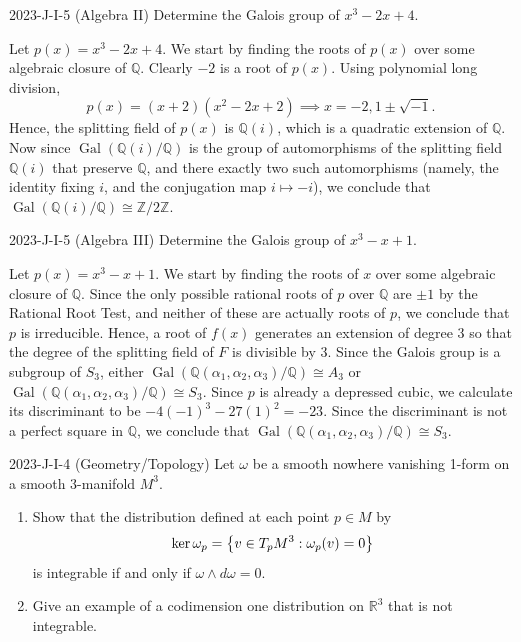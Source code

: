\documentclass{article}
\begin{document}
\begin{prb}{2023-J-I-5 (Algebra II)}
	Determine the Galois group of $x^{3} - 2x + 4$. 
\end{prb}
\begin{solutions}
	Let $p(x) = x^{3} - 2x + 4$. We start by finding the roots of $p(x)$ over some algebraic closure of $\mathbb{Q}$. Clearly $-2$ is a root of $p(x)$. Using polynomial long division, 
		\begin{equation}
			p(x) = (x+ 2)(x^{2} - 2x + 2) \implies x = -2, 1 \pm \sqrt{-1}. 
		\end{equation}
	Hence, the splitting field of $p(x)$ is $\mathbb{Q}(i)$, which is a quadratic extension of $\mathbb{Q}$. Now since $\operatorname{Gal}(\mathbb{Q}(i)/\mathbb{Q})$ is the group of automorphisms of the splitting field $\mathbb{Q}(i)$ that preserve $\mathbb{Q}$, and there exactly two such automorphisms (namely, the identity fixing $i$, and the conjugation map $i \mapsto -i$), we conclude that $\operatorname{Gal}(\mathbb{Q}(i)/\mathbb{Q}) \cong \mathbb{Z}/2\mathbb{Z}$. 
\end{solutions}
\begin{prb}{2023-J-I-5 (Algebra III)}
	Determine the Galois group of $x^{3} - x + 1$. 
\end{prb}
\begin{solutions}
	Let $p(x) = x^{3} - x + 1$. We start by finding the roots of $x$ over some algebraic closure of $\mathbb{Q}$. Since the only possible rational roots of $p$ over $\mathbb{Q}$ are $\pm 1$ by the Rational Root Test, and neither of these are actually roots of $p$, we conclude that $p$ is irreducible. Hence, a root of $f(x)$ generates an extension of degree 3 so that the degree of the splitting field of $F$ is divisible by 3. Since the Galois group is a subgroup of $S_{3}$, either $\operatorname{Gal}(\mathbb{Q}(\alpha_{1}, \alpha_{2}, \alpha_{3})/\mathbb{Q}) \cong A_{3}$ or $\operatorname{Gal}(\mathbb{Q}(\alpha_{1}, \alpha_{2}, \alpha_{3})/\mathbb{Q}) \cong S_{3}$. Since $p$ is already a depressed cubic, we calculate its discriminant to be $-4(-1)^{3} - 27(1)^{2} = -23$. Since the discriminant is not a perfect square in $\mathbb{Q}$, we conclude that $\operatorname{Gal}(\mathbb{Q}(\alpha_{1}, \alpha_{2},\alpha_{3})/\mathbb{Q}) \cong S_{3}$. 
\end{solutions}
\begin{prb}{2023-J-I-4 (Geometry/Topology)}
	Let $\omega$ be a smooth nowhere vanishing 1-form on a smooth 3-manifold $M^{3}$. \vspace{-0.25cm}
		\begin{enumerate}[itemsep =-2pt,label = (\alph{*})]
			\item Show that the distribution defined at each point $p \in M$ by 
				\begin{equation}
					\ker{\omega_{p}} = \brac*{v \in T_{p}M^{3}: \omega_{p}(v) = 0}
				\end{equation}
			is integrable if and only if $\omega \wedge d\omega = 0$. 
			\item Give an example of a codimension one distribution on $\mathbb{R}^{3}$ that is not integrable. 
		\end{enumerate}
\end{prb}
\end{document}
